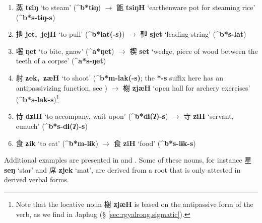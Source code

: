 \documentclass[oneside,a4paper,11pt]{article}
\newcommand{\ipa}[1]{\textbf{{\phon\mbox{#1}}}} %
\newcommand{\zh}[1]{{\cn #1}}
\newcommand{\zhc}[2]{\zh{#1} \ipa{#2}}
\begin{document}
\begin{enumerate}
\item \zhc{蒸}{tɕiŋ} `to steam' (\ipa{^b*tɨŋ}) $\rightarrow$ \zhc{甑}{tsiŋH} `earthenware pot for steaming rice' (\ipa{^b*s-tɨŋ-s})
\item \zhc{抴}{jet, jejH} `to pull' (\ipa{^b*lat(-s)}) $\rightarrow$ \zhc{靾}{sjet} `leading string' (\ipa{^b*s-lat})
\item \zhc{囓}{ŋet} `to bite, gnaw' (\ipa{^a*ŋet}) $\rightarrow$ \zhc{楔}{set} `wedge, piece of wood between the teeth of a corpse' (\ipa{^a*s-ŋet})
\item \zhc{射}{ʑek, ʑæH} `to shoot' (\ipa{^b*m-lak(-s)}; the \ipa{*-s} suffix here has an antipassivizing function, see \citealt{jacques18antipass}) $\rightarrow$ \zhc{榭}{zjæH} `open hall for archery exercises' (\ipa{^b*s-lak-s})\footnote{
Note that the locative noun \zhc{榭}{zjæH} is based on the antipassive form of the verb, as we find in Japhug (§ \ref{sec:rgyalrong.sigmatic}). }
\item \zhc{侍}{dʑiH} `to accompany, wait upon' (\ipa{^b*dɨ(ʔ)-s}) $\rightarrow$ \zhc{寺}{ziH} `servant, eunuch' (\ipa{^b*s-dɨ(ʔ)-s})
\item \zhc{食}{ʑik} `to eat' (\ipa{^b*m-lɨk}) $\rightarrow$ \zhc{食}{ziH} `food' (\ipa{^b*s-lɨk-s})
\end{enumerate}

Additional examples are presented in \citet[56]{bs14oc} and \citealt{sagart12sprefix}. Some of these nouns, for instance \zhc{星}{seŋ} `star’ and \zhc{席}{zjek} `mat’, are derived from a root that is only attested in derived verbal forms.
\end{document}
